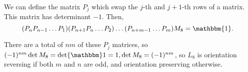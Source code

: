 \documentclass{exam}
\numberwithin{equation}{section}
\begin{document}
\begin{enumerate}[label=\alph*)]
        We can define the matrix $P_j$ which swap the $j$-th and $j+1$-th rows of a matrix. This matrix has determinant $-1$. Then,
        \[
            (P_{n}P_{n-1}\dots P_1)(P_{n+1}P_n\dots P_2)\dots(P_{n+m-1}\dots P_{m})M_8=\mathbbm{1}. 
        \]

        There are a total of $nm$ of these $P_j$ matrices, so \((-1)^{nm}\det M_8=\det\mathbbm 1=1, \det M_8=(-1)^{nm}\), so \(L_8\) is orientation reversing if both \(m\) and \(n\) are odd, and orientation preserving otherwise.
    \end{enumerate}
\end{document}
